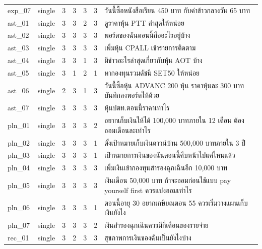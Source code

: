 \documentclass[11pt,a4paper]{article}
\begin{document}
{\begin{longtable}{llrrrrp{7.2cm}}
exp\_\allowbreak{}07 & single & 3 & 3 & 3 & 3 & {\thaifont วันนี้ซื้อหนังสือเรียน }450 {\thaifont บาท กับค่าข้าวกลางวัน }65 {\thaifont บาท} \\
ast\_\allowbreak{}01 & single & 3 & 3 & 2 & 3 & {\thaifont ดูราคาหุ้น }PTT {\thaifont ล่าสุดให้หน่อย} \\
ast\_\allowbreak{}02 & single & 3 & 3 & 3 & 3 & {\thaifont พอร์ตของฉันตอนนี้ถืออะไรอยู่บ้าง} \\
ast\_\allowbreak{}03 & single & 3 & 3 & 3 & 3 & {\thaifont เพิ่มหุ้น }CPALL {\thaifont เข้ารายการติดตาม} \\
ast\_\allowbreak{}04 & single & 3 & 3 & 1 & 3 & {\thaifont มีข่าวอะไรล่าสุดเกี่ยวกับหุ้น }AOT {\thaifont บ้าง} \\
ast\_\allowbreak{}05 & single & 3 & 1 & 2 & 1 & {\thaifont หากองทุนรวมดัชนี }SET50 {\thaifont ให้หน่อย} \\
ast\_\allowbreak{}06 & single & 2 & 3 & 1 & 3 & {\thaifont วันนี้ซื้อหุ้น }ADVANC 200 {\thaifont หุ้น ราคาหุ้นละ }300 {\thaifont บาท บันทึกลงพอร์ตให้ด้วย} \\
ast\_\allowbreak{}07 & single & 3 & 3 & 3 & 3 & {\thaifont หุ้นปตท}.{\thaifont ตอนนี้ราคาเท่าไร} \\
pln\_\allowbreak{}01 & single & 3 & 3 & 3 & 2 & {\thaifont อยากเก็บเงินให้ได้ }100,000 {\thaifont บาทภายใน }12 {\thaifont เดือน ต้องออมเดือนละเท่าไร} \\
pln\_\allowbreak{}02 & single & 3 & 3 & 3 & 1 & {\thaifont ตั้งเป้าหมายเก็บเงินดาวน์บ้าน }500,000 {\thaifont บาทภายใน }3 {\thaifont ปี} \\
pln\_\allowbreak{}03 & single & 3 & 3 & 3 & 1 & {\thaifont เป้าหมายการเงินของฉันตอนนี้คืบหน้าไปแค่ไหนแล้ว} \\
pln\_\allowbreak{}04 & single & 3 & 3 & 3 & 3 & {\thaifont เพิ่มเงินเข้ากองทุนสำรองฉุกเฉินอีก }10,000 {\thaifont บาท} \\
pln\_\allowbreak{}05 & single & 3 & 3 & 3 & 3 & {\thaifont เงินเดือน }50,000 {\thaifont บาท ถ้าจะออมก่อนใช้แบบ }pay yourself first {\thaifont ควรแบ่งออมเท่าไร} \\
pln\_\allowbreak{}06 & single & 3 & 3 & 3 & 1 & {\thaifont ตอนนี้อายุ }30 {\thaifont อยากเกษียณตอน }55 {\thaifont ควรเริ่มวางแผนเก็บเงินยังไง} \\
pln\_\allowbreak{}07 & single & 3 & 3 & 3 & 2 & {\thaifont เงินสำรองฉุกเฉินควรมีกี่เดือนของรายจ่าย} \\
rec\_\allowbreak{}01 & single & 3 & 2 & 3 & 3 & {\thaifont สุขภาพการเงินของฉันเป็นยังไงบ้าง} \\

\end{longtable}}
\end{document}
